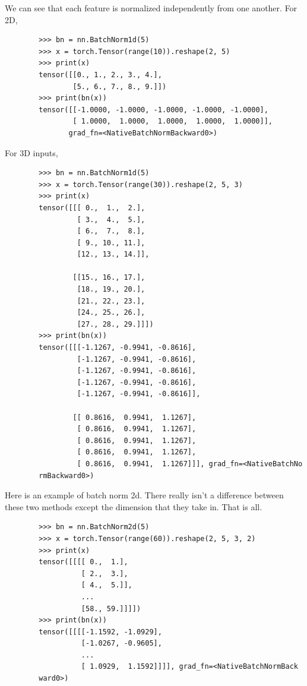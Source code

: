     \begin{example}
      We can see that each feature is normalized independently from one another. For 2D, 
      \begin{lstlisting}
        >>> bn = nn.BatchNorm1d(5)
        >>> x = torch.Tensor(range(10)).reshape(2, 5)
        >>> print(x) 
        tensor([[0., 1., 2., 3., 4.],
                [5., 6., 7., 8., 9.]])
        >>> print(bn(x))
        tensor([[-1.0000, -1.0000, -1.0000, -1.0000, -1.0000],
                [ 1.0000,  1.0000,  1.0000,  1.0000,  1.0000]],
               grad_fn=<NativeBatchNormBackward0>)
      \end{lstlisting}
      For 3D inputs, 
      \begin{lstlisting}
        >>> bn = nn.BatchNorm1d(5)
        >>> x = torch.Tensor(range(30)).reshape(2, 5, 3)
        >>> print(x) 
        tensor([[[ 0.,  1.,  2.],
                 [ 3.,  4.,  5.],
                 [ 6.,  7.,  8.],
                 [ 9., 10., 11.],
                 [12., 13., 14.]],

                [[15., 16., 17.],
                 [18., 19., 20.],
                 [21., 22., 23.],
                 [24., 25., 26.],
                 [27., 28., 29.]]])
        >>> print(bn(x))
        tensor([[[-1.1267, -0.9941, -0.8616],
                 [-1.1267, -0.9941, -0.8616],
                 [-1.1267, -0.9941, -0.8616],
                 [-1.1267, -0.9941, -0.8616],
                 [-1.1267, -0.9941, -0.8616]],

                [[ 0.8616,  0.9941,  1.1267],
                 [ 0.8616,  0.9941,  1.1267],
                 [ 0.8616,  0.9941,  1.1267],
                 [ 0.8616,  0.9941,  1.1267],
                 [ 0.8616,  0.9941,  1.1267]]], grad_fn=<NativeBatchNo
        rmBackward0>)
      \end{lstlisting}
    \end{example}

    \begin{example}
      Here is an example of batch norm 2d. There really isn't a difference between these two methods except the dimension that they take in. That is all. 
      \begin{lstlisting}
        >>> bn = nn.BatchNorm2d(5)
        >>> x = torch.Tensor(range(60)).reshape(2, 5, 3, 2)
        >>> print(x) 
        tensor([[[[ 0.,  1.],
                  [ 2.,  3.],
                  [ 4.,  5.]],
                  ...
                  [58., 59.]]]])
        >>> print(bn(x))
        tensor([[[[-1.1592, -1.0929],
                  [-1.0267, -0.9605],
                  ...
                  [ 1.0929,  1.1592]]]], grad_fn=<NativeBatchNormBack
        ward0>)
      \end{lstlisting}
    \end{example}

